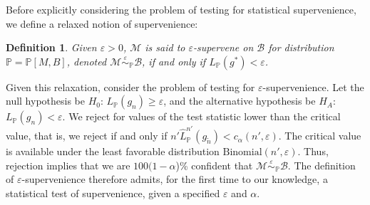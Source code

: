 \documentclass{article}
\newcommand{\mB}{\mathcal{B}}
\newcommand{\mM}{\mathcal{M}}
\newcommand{\PP}{\mathbb{P}}           %
\newcommand{\eps}{\varepsilon}
\providecommand{\mc}[1]{\mathcal{#1}}
\providecommand{\mt}[1]{\widetilde{#1}}
\newcommand{\hL}{\widehat{L}}
\newcommand{\MeB}{\mM \overset{\varepsilon}{{\sim}}_{\PP} \mB}
\newtheorem{defi}{Definition}
\begin{document}
Before explicitly considering the problem of testing for statistical supervenience, we define a relaxed notion of supervenience:
\begin{defi}
\label{def2}
Given $\varepsilon > 0$, $\mM$ is said to $\varepsilon$-\textit{supervene} on $\mB$ for distribution $\PP=\PP[M,B]$, denoted $\MeB$, if and only if $L_{\PP}(g^*) < \varepsilon$.
\end{defi}

Given this relaxation, consider the problem of testing for $\eps$-supervenience.  %
Let the null hypothesis be $H_0$: $L_{\PP}(g_n) \geq \eps$, and the alternative hypothesis be $H_A$: $L_{\PP}(g_n) < \eps$.  We reject for  values of the test   statistic lower than the critical value, that is, we reject if and only if $n' \hL^{n'}_{\PP}(g_{\mt{n}}) <c_{\alpha}(n',\varepsilon)$.  The critical value is available under the least favorable distribution $\text{Binomial}(n',\varepsilon)$.  Thus, rejection implies that we are $100(1-\alpha$)\% confident that $\MeB$.  The definition of $\eps$-supervenience therefore admits, for the first time to our knowledge, a statistical test of supervenience, given a specified $\eps$ and $\alpha$. %



	
	
\end{document}
